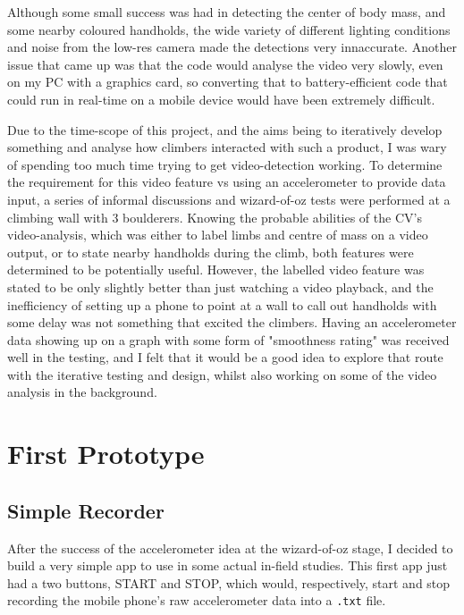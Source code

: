 Although some small success was had in detecting the center of body mass, and some nearby coloured handholds, the wide variety of different lighting conditions and noise from the low-res camera made the detections very innaccurate.
Another issue that came up was that the code would analyse the video very slowly, even on my PC with a graphics card, so converting that to battery-efficient code that could run in real-time on a mobile device would have been extremely difficult.

Due to the time-scope of this project, and the aims being to iteratively develop something and analyse how climbers interacted with such a product, I was wary of spending too much time trying to get video-detection working.
To determine the requirement for this video feature vs using an accelerometer to provide data input, a series of informal discussions and wizard-of-oz tests were performed at a climbing wall with 3 boulderers.
Knowing the probable abilities of the CV's video-analysis, which was either to label limbs and centre of mass on a video output, or to state nearby handholds during the climb, both features were determined to be potentially useful.
However, the labelled video feature was stated to be only slightly better than just watching a video playback, and the inefficiency of setting up a phone to point at a wall to call out handholds with some delay was not something that excited the climbers.
Having an accelerometer data showing up on a graph with some form of "smoothness rating" was received well in the testing, and I felt that it would be a good idea to explore that route with the iterative testing and design, whilst also working on some of the video analysis in the background.


\section{First Prototype}

\subsection{Simple Recorder}
After the success of the accelerometer idea at the wizard-of-oz stage, I decided to build a very simple app to use in some actual in-field studies.
This first app just had a two buttons, START and STOP, which would, respectively, start and stop recording the mobile phone's raw accelerometer data into a \verb|.txt| file.

